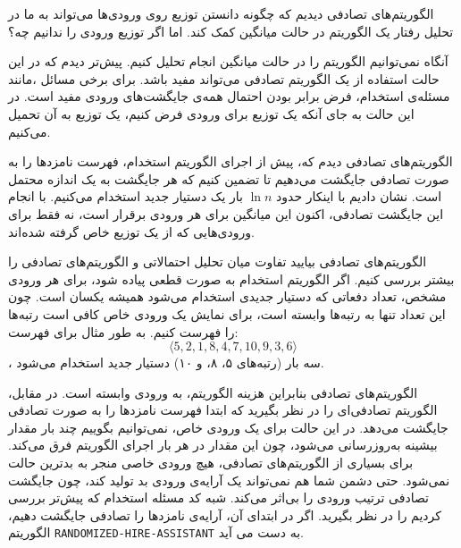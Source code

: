 \begin{itemframe}{الگوریتم‌های تصادفی}
\itm
دیدیم که چگونه دانستن توزیع روی ورودی‌ها می‌تواند به ما در تحلیل رفتار یک الگوریتم در حالت میانگین کمک کند. اما اگر توزیع ورودی را ندانیم چه؟

\itm
آنگاه نمی‌توانیم الگوریتم را در حالت میانگین انجام تحلیل کنیم. پیش‌تر دیدم که در این حالت استفاده از یک الگوریتم تصادفی
 می‌تواند مفید باشد.
\itm
برای برخی مسائل ،مانند مسئله‌ی استخدام، فرض برابر بودن احتمال همه‌ی جایگشت‌های ورودی مفید است.
در این حالت به جای آنکه یک توزیع برای ورودی فرض کنیم، یک توزیع به آن تحمیل می‌کنیم.
\end{itemframe}


\begin{itemframe}{الگوریتم‌های تصادفی}
\itm
دیدم که، پیش از اجرای الگوریتم استخدام، فهرست نامزدها را به صورت تصادفی جایگشت می‌دهیم تا تضمین کنیم که هر جایگشت به یک اندازه محتمل است. نشان دادیم با اینکار حدود
$\ln n$
بار یک دستیار جدید استخدام می‌کنیم.
\itm
با انجام این جایگشت تصادفی، اکنون این میانگین برای هر ورودی برقرار است، نه فقط برای ورودی‌هایی که از یک توزیع خاص گرفته شده‌اند.
\end{itemframe}


\begin{itemframe}{الگوریتم‌های تصادفی}
\itm
بیایید تفاوت میان تحلیل احتمالاتی و الگوریتم‌های تصادفی را بیشتر بررسی کنیم.
\itm
اگر الگوریتم استخدام به صورت قطعی پیاده شود، برای هر ورودی مشخص، تعداد دفعاتی که دستیار جدیدی استخدام می‌شود همیشه یکسان است.
چون این تعداد تنها به رتبه‌ها وابسته است، برای نمایش یک ورودی خاص کافی است رتبه‌ها را فهرست کنیم.
\itm
به طور مثال برای فهرست:
$$\langle 5,2,1,8,4,7,10,9,3,6 \rangle$$
، سه بار (رتبه‌های ۵، ۸، و ۱۰) دستیار جدید استخدام می‌شود.
\end{itemframe}


\begin{itemframe}{الگوریتم‌های تصادفی}
\itm
بنابراین هزینه الگوریتم، به ورودی وابسته است. در مقابل، الگوریتم تصادفی‌ای را در نظر بگیرید که ابتدا فهرست نامزدها را به صورت تصادفی جایگشت می‌دهد.
در این حالت برای یک ورودی خاص، نمی‌توانیم بگوییم چند بار مقدار بیشینه به‌روزرسانی می‌شود، چون این مقدار در هر بار اجرای الگوریتم فرق می‌کند.
\itm
برای بسیاری از الگوریتم‌های تصادفی، هیچ ورودی خاصی منجر به بدترین حالت نمی‌شود. حتی دشمن شما هم نمی‌تواند یک آرایه‌ی ورودی بد تولید کند، چون جایگشت تصادفی ترتیب ورودی را بی‌اثر می‌کند.
\itm
شبه کد مسئله استخدام که پیش‌تر بررسی کردیم را در نظر بگیرید. اگر در ابتدای آن، آرایه‌ی نامزدها را تصادفی جایگشت دهیم، الگوریتم
\texttt{RANDOMIZED-HIRE-ASSISTANT}
 به دست می آید.
\end{itemframe}


